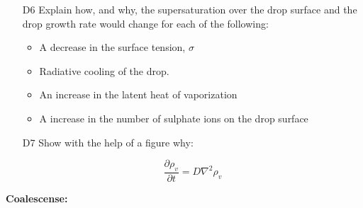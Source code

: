 \documentclass[12pt]{article}
\begin{document}
\begin{enumerate}
\item[D6] Explain how, and why, the supersaturation over the drop surface and
the drop growth rate would change for each of the following:


\begin{itemize}
\item A decrease in the surface tension, $\sigma$
\item Radiative cooling of the drop.
\item An increase in the latent heat of vaporization
\item A increase in the number of sulphate ions on the drop surface
\end{itemize}



\item[D7] Show  with the help of a figure why:

  \begin{equation}
    \label{eq:flux}
    \frac{\partial \rho_v}{\partial t} =  D  \nabla^2 \rho_v
  \end{equation}

\end{enumerate}

\noindent
\textbf{Coalescense:}
\end{document}
